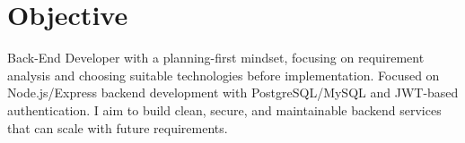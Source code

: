 \section{Objective}
Back-End Developer with a planning-first mindset, focusing on requirement analysis and choosing suitable technologies before implementation.
Focused on Node.js/Express backend development with PostgreSQL/MySQL and JWT-based authentication.
I aim to build clean, secure, and maintainable backend services that can scale with future requirements.
